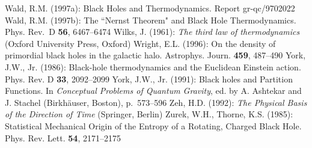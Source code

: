 \begin{thebibliography}
%
\bibitem{}{}{}
Wald, R.M. (1997a): Black Holes and Thermodynamics. Report
gr-qc/9702022
%
\bibitem{}{}{}
Wald, R.M. (1997b): The ``Nernst Theorem" and Black Hole
Thermodynamics. Phys. Rev.~D {\bf 56}, 6467--6474
%
\bibitem{}{}{}
Wilks, J. (1961):
{\it The third law of thermodynamics}
(Oxford University Press, Oxford)
%
\bibitem{}{}{}
Wright, E.L. (1996): On the density of primordial black holes
in the galactic halo. Astrophys. Journ. {\bf 459}, 487--490
%
\bibitem{}{}{}
York, J.W., Jr. (1986): Black-hole thermodynamics and the
Euclidean Einstein action. Phys. Rev. D {\bf 33}, 2092--2099
%
\bibitem{}{}{}
York, J.W., Jr. (1991): Black holes and Partition Functions.
In {\it Conceptual Problems of Quantum Gravity}, ed. by A. Ashtekar
and J. Stachel (Birkh\"auser, Boston), p.~573--596
%
\bibitem{}{}{}
Zeh, H.D. (1992): {\it The Physical Basis of the Direction of Time}
(Springer, Berlin)
%
\bibitem{}{}{}
Zurek, W.H., Thorne, K.S. (1985): Statistical Mechanical Origin
of the Entropy of a Rotating, Charged Black Hole.
Phys. Rev. Lett. {\bf 54}, 2171--2175
%

\end{thebibliography}


